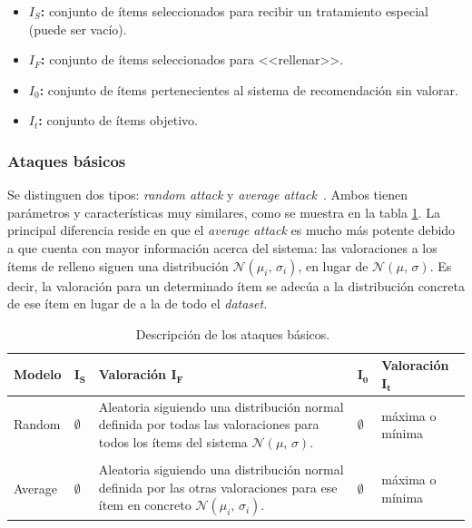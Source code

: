 \begin{itemize}
	
	\item \textbf{$I_S$:} conjunto de ítems seleccionados para recibir un tratamiento especial (puede ser vacío).
	\item \textbf{$I_F$:} conjunto de ítems seleccionados para <<rellenar>>.
	\item \textbf{$I_0$:} conjunto de ítems pertenecientes al sistema de recomendación sin valorar.
	\item \textbf{$I_t$:} conjunto de ítems objetivo.
	
\end{itemize}


\subsubsection{Ataques básicos}

Se distinguen dos tipos: \textit{random attack} y \textit{average attack}~\cite{mingdan2018ShillingAttacksAReview}. Ambos tienen parámetros y características muy similares, como se muestra en la tabla \ref{tabla_descripcion_ataques_basicos}. La principal diferencia reside en que el \textit{average attack} es mucho más potente debido a que cuenta con mayor información acerca del sistema: las valoraciones a los ítems de relleno siguen una distribución $\mathcal{N}(\mu_i,\,\sigma_i)$, en lugar de $\mathcal{N}(\mu,\,\sigma)$. Es decir, la valoración para un determinado ítem se adecúa a la distribución concreta de ese ítem en lugar de a la de todo el \textit{dataset}.


\begin{table}
\small
\begin{centering}

		\begin{tabular}{@{}p{5em} p{2em} p{14em} p{2em} p{7em}@{}}
		\toprule
		\textbf{Modelo} & $\mathbf{I_S}$ & \textbf{Valoración} $\mathbf{I_F}$ & \hfil $\mathbf{I_0}$ & \textbf{Valoración} $\mathbf{I_t}$\\ 
		\midrule
	
		Random & $\emptyset$ & Aleatoria siguiendo una distribución normal definida por todas las valoraciones para todos los ítems del sistema $\mathcal{N}(\mu,\,\sigma)$. & \hfil $\emptyset$ & máxima o mínima \\\\
		
		Average & $\emptyset$ & Aleatoria siguiendo una distribución normal definida por las otras valoraciones para ese ítem en concreto $\mathcal{N}(\mu_i,\,\sigma_i)$. & \hfil $\emptyset$ & máxima o mínima\\
		\bottomrule
		\end{tabular}
	
\end{centering}
\caption[Sistemas de recomendación: ataques básicos]{Descripción de los ataques básicos.~\cite{zhou2021SemisupervisedRecommendationAttack}}
\label{tabla_descripcion_ataques_basicos}	
\end{table}


